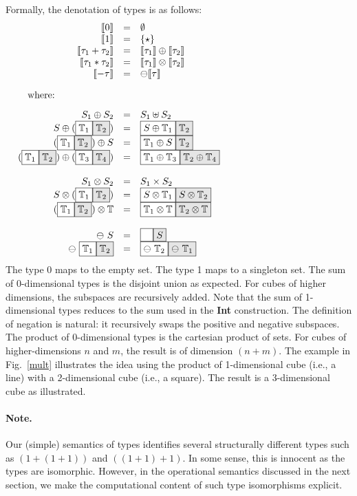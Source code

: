 \documentclass[authoryear,preprint]{sigplanconf}
\newcommand{\cubt}{\mathbb{T}}
\newcommand{\den}[1]{\llbracket #1 \rrbracket}
\newcommand{\nodet}[2]{\fcolorbox{black}{white}{$#1$}\fcolorbox{black}{gray!20}{$#2$}}
\begin{document}
Formally, the denotation of types is as follows:
\[\begin{array}{rcl}
\den{0} &=& \emptyset \\
\den{1} &=& \{ \star \} \\
\den{\tau_1 + \tau_2} &=& \den{\tau_1} \oplus \den{\tau_2} \\
\den{\tau_1 * \tau_2} &=& \den{\tau_1} \otimes \den{\tau_2} \\
\den{- \tau} &=& \ominus \den{\tau} \\
\\
\noalign{\mbox{where:}\hfill}
\\
S_1 \oplus S_2 &=& S_1 \uplus S_2 \\
S \oplus (\nodet{\cubt_1}{\cubt_2}) &=& \nodet{S \oplus \cubt_1}{\cubt_2} \\
(\nodet{\cubt_1}{\cubt_2}) \oplus S &=& \nodet{\cubt_1 \oplus S}{\cubt_2} \\
(\nodet{\cubt_1}{\cubt_2}) \oplus (\nodet{\cubt_3}{\cubt_4}) &=& 
  \nodet{\cubt_1 \oplus \cubt_3}{\cubt_2 \oplus \cubt_4} \\
\\
S_1 \otimes S_2 &=& S_1 \times S_2 \\
S \otimes (\nodet{\cubt_1}{\cubt_2}) &=& 
  \nodet{S \otimes \cubt_1}{S \otimes \cubt_2} \\
(\nodet{\cubt_1}{\cubt_2}) \otimes \cubt &=& 
  \nodet{\cubt_1 \otimes \cubt}{\cubt_2 \otimes \cubt} \\
\\
\ominus~S &=& \nodet{\phantom{S}}{S} \\
\ominus~\nodet{\cubt_1}{\cubt_2} &=& \nodet{\ominus~\cubt_2}{\ominus~\cubt_1} 
\end{array}\]
The type 0 maps to the empty set. The type 1 maps to a singleton set. The sum
of $0$-dimensional types is the disjoint union as expected. For cubes of
higher dimensions, the subspaces are recursively added. Note that the sum of
1-dimensional types reduces to the sum used in the \textbf{Int} construction.
The definition of negation is natural: it recursively swaps the positive and
negative subspaces. The product of 0-dimensional types is the cartesian
product of sets. For cubes of higher-dimensions $n$ and $m$, the result is of
dimension $(n+m)$. The example in Fig.~\ref{mult} illustrates the idea using
the product of 1-dimensional cube (i.e., a line) with a 2-dimensional cube
(i.e., a square). The result is a 3-dimensional cube as illustrated. 

\paragraph*{Note.} 
Our (simple) semantics of types identifies several structurally different
types such as $(1+(1+1))$ and $((1+1)+1)$. In some sense, this is innocent as
the types are isomorphic. However, in the operational semantics discussed in
the next section, we make the computational content of such type isomorphisms
explicit.
\end{document}
